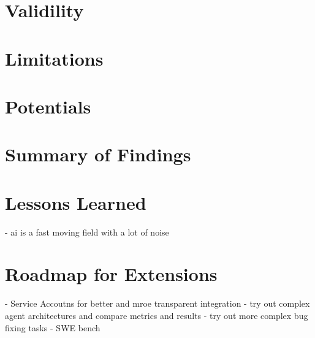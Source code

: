 \section{Validility}

\section{Limitations}
\section{Potentials}

\section{Summary of Findings}
\section{Lessons Learned}
- ai is a fast moving field with a lot of noise 

\section{Roadmap for Extensions}
- Service Accoutns for better and mroe transparent integration
- try out complex agent architectures and compare metrics and results
- try out more complex bug fixing tasks - SWE bench